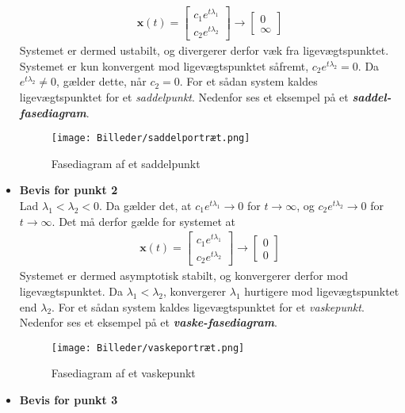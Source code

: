 \begin{bev}
\begin{itemize}
\begin{align*}
        \textbf{x}(t) = \begin{bmatrix} c_1e^{t\lambda_1} \\ c_2e^{t\lambda_2}\end{bmatrix} \to \begin{bmatrix}0 \\ \infty \end{bmatrix}
    \end{align*}
    Systemet er dermed ustabilt, og divergerer derfor væk fra ligevægtspunktet. Systemet er kun konvergent mod ligevægtspunktet såfremt, $c_2e^{t\lambda_2} = 0$. Da $e^{t\lambda_2} \neq 0$, gælder dette, når $c_2 = 0$. For et sådan system kaldes ligevægtspunktet for et \textit{saddelpunkt}. Nedenfor ses et eksempel på et \textbf{\textit{saddel-fasediagram}}.
    \begin{figure}[H]
        \centering
        \texttt{[image: Billeder/saddelportræt.png]}
        \caption{Fasediagram af et saddelpunkt}
        \label{fig:saddelportræt_bevis}
    \end{figure}
    \item [] \textbf{Bevis for punkt 2}\\
    Lad $\lambda_1<\lambda_2<0$. Da gælder det, at $c_1e^{t\lambda_1} \to 0$ for $t\to \infty$, og $c_2e^{t\lambda_2} \to 0$ for $t \to \infty$. Det må derfor gælde for systemet at 
    \begin{align*}
        \textbf{x}(t) = \begin{bmatrix} c_1e^{t\lambda_1} \\ c_2e^{t\lambda_2}\end{bmatrix} \to \begin{bmatrix}0 \\ 0 \end{bmatrix}
    \end{align*}
    Systemet er dermed asymptotisk stabilt, og konvergerer derfor mod ligevægtspunktet. 
    Da $\lambda_1<\lambda_2$, konvergerer $\lambda_1$ hurtigere mod ligevægtspunktet end $\lambda_2$.
    For et sådan system kaldes ligevægtspunktet for et \textit{vaskepunkt}. Nedenfor ses et eksempel på et \textbf{\textit{vaske-fasediagram}}.
    \begin{figure}[H]
        \centering
        \texttt{[image: Billeder/vaskeportræt.png]}
        \caption{Fasediagram af et vaskepunkt}
        \label{fig:vaskeportræt_bevis}
    \end{figure}
    \item [] \textbf{Bevis for punkt 3}\\

\end{itemize}
\end{bev}
